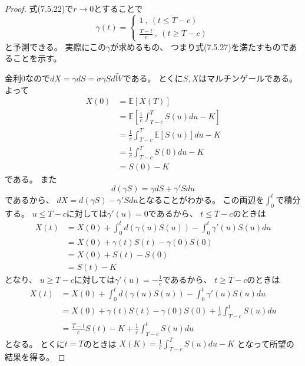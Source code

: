 \documentclass[uplatex]{jsarticle}
\theoremstyle{definition}
\def\E{\mathbb{E}}
\begin{document}
\begin{proof}
  式(7.5.22)で\(r\to 0\)とすることで
  \[
  \gamma(t) =
  \begin{cases}
    1 \ , \ (t \leq T-c) \\
    \frac{T-t}{c} \ , \ (t \geq T-c)
  \end{cases}
  \]
  と予測できる。
  実際にこの\(\gamma\)が求めるもの、
  つまり式(7.5.27)を満たすものであることを示す。

  金利\(0\)なので\(dX = \gamma dS = \sigma \gamma S d\tilde{W}\)である。
  とくに\(S,X\)はマルチンゲールである。
  よって
  \begin{align*}
    X(0) &= \E\left[ X(T)\right] \\
    &= \E\left[ \frac{1}{c}\int_{T-c}^TS(u)du - K \right] \\
    &= \frac{1}{c}\int_{T-c}^T\E\left[ S(u) \right] du - K \\
    &= \frac{1}{c}\int_{T-c}^TS(0) du - K \\
    &= S(0) - K
  \end{align*}
  である。
  また
  \[
  d(\gamma S) = \gamma dS + \gamma 'Sdu
  \]
  であるから、
  \(dX = d(\gamma S) - \gamma 'Sdu\)となることがわかる。
  この両辺を\(\int_0^t\)で積分する。
  \(u \leq T-c\)に対しては\(\gamma'(u) = 0\)であるから、
  \(t\leq T-c\)のときは
  \begin{align*}
    X(t)
    &= X(0) + \int_0^t d(\gamma (u)S(u))
    - \int_0^t \gamma'(u)S(u)du \\
    &= X(0) + \gamma(t)S(t) - \gamma(0)S(0) \\
    &= X(0) + S(t) - S(0) \\
    &= S(t) - K
  \end{align*}
  となり、
  \(u \geq T-c\)に対しては\(\gamma'(u) = -\frac{1}{c}\)であるから、
  \(t\geq T-c\)のときは
  \begin{align*}
    X(t)
    &= X(0) + \int_0^t d(\gamma (u)S(u))
    - \int_0^t \gamma'(u)S(u)du \\
    &= X(0) + \gamma(t)S(t) - \gamma(0)S(0)
    + \frac{1}{c} \int_{T-c}^t S(u)du \\
    &= \frac{T-t}{c}S(t) - K
    + \frac{1}{c} \int_{T-c}^t S(u)du
  \end{align*}
  となる。
  とくに\(t=T\)のときは
  \(X(K) = \frac{1}{c} \int_{T-c}^T S(u)du - K\)
  となって所望の結果を得る。
\end{proof}
\end{document}

